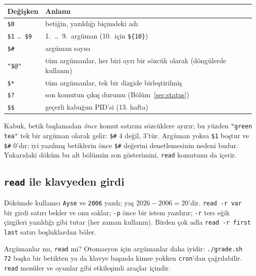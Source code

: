 \documentclass[11pt,a4paper]{article}
\newcommand{\cmd}[1]{\texttt{#1}}
\begin{document}



\begin{center}
\small
\begin{tabular}{@{}ll@{}}
\toprule
\textbf{Değişken} & \textbf{Anlamı}\\
\midrule
\texttt{\$0} & betiğin, yazıldığı biçimdeki adı\\
\texttt{\$1} \ldots\ \texttt{\$9} & 1.\ \ldots\ 9.\ argüman (10.\ için \texttt{\$\{10\}})\\
\texttt{\$\#} & argüman sayısı\\
\texttt{"\$@"} & tüm argümanlar, her biri ayrı bir sözcük olarak (döngülerde kullanın)\\
\texttt{\$*} & tüm argümanlar, tek bir dizgide birleştirilmiş\\
\texttt{\$?} & son komutun çıkış durumu (Bölüm~\ref{sec:status})\\
\texttt{\$\$} & geçerli kabuğun PID'si (13. hafta)\\
\bottomrule
\end{tabular}
\end{center}

Kabuk, betik başlamadan \emph{önce} komut satırını sözcüklere ayırır; bu yüzden \texttt{"green tea"} tek bir argüman olarak gelir: \texttt{\$\#} $4$ değil, $3$'tür. Argüman yoksa \texttt{\$1} boştur ve \texttt{\$\#} $0$'dır; iyi yazılmış betiklerin önce \texttt{\$\#} değerini denetlemesinin nedeni budur. Yukarıdaki döküm bu alt bölümün son gösterimini, \texttt{read} komutunu da içerir.

\subsection{\texttt{read} ile klavyeden girdi}



Dökümde kullanıcı \texttt{Ayse} ve \texttt{2006} yazdı; yaş $2026 - 2006 = 20$'dir. \cmd{read -r var} bir girdi satırı bekler ve onu saklar; \texttt{-p} önce bir istem yazdırır; \texttt{-r} ters eğik çizgileri yazıldığı gibi tutar (her zaman kullanın). Birden çok adla \cmd{read -r first last} satırı boşluklardan böler.

Argümanlar mı, \texttt{read} mi? Otomasyon için argümanlar daha iyidir: \texttt{./grade.sh 72} başka bir betikten ya da klavye başında kimse yokken \cmd{cron}'dan çağrılabilir. \texttt{read} menüler ve oyunlar gibi etkileşimli araçlar içindir.
\end{document}
